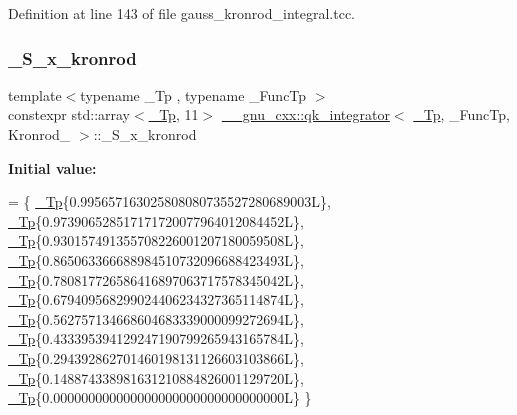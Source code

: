 Definition at line 143 of file gauss\+\_\+kronrod\+\_\+integral.\+tcc.

\mbox{\label{struct____gnu__cxx_1_1qk__integrator_3_01__Tp_00_01__FuncTp_00_01Kronrod__21_01_4_a1eb98377a298bd31aa92783c6ec6e51e}} 
\subsubsection{\texorpdfstring{\+\_\+\+S\+\_\+x\+\_\+kronrod}{\_S\_x\_kronrod}}
{\footnotesize\ttfamily template$<$typename \+\_\+\+Tp , typename \+\_\+\+Func\+Tp $>$ \\
constexpr std\+::array$<$\hyperlink{namespace____gnu__cxx_a3b19a9c800ca194374ef9172290f7d79}{\+\_\+\+Tp}, 11$>$ \hyperlink{class____gnu__cxx_1_1qk__integrator}{\+\_\+\+\_\+gnu\+\_\+cxx\+::qk\+\_\+integrator}$<$ \hyperlink{namespace____gnu__cxx_a3b19a9c800ca194374ef9172290f7d79}{\+\_\+\+Tp}, \+\_\+\+Func\+Tp, Kronrod\+\_ $>$\+::\+\_\+\+S\+\_\+x\+\_\+kronrod\hspace{0.3cm}{\ttfamily [static]}}

{\bfseries Initial value\+:}
\begin{DoxyCode}
=
      \{
        \hyperlink{namespace____gnu__cxx_a3b19a9c800ca194374ef9172290f7d79}{\_Tp}\{0.995657163025808080735527280689003L\},
        \hyperlink{namespace____gnu__cxx_a3b19a9c800ca194374ef9172290f7d79}{\_Tp}\{0.973906528517171720077964012084452L\},
        \hyperlink{namespace____gnu__cxx_a3b19a9c800ca194374ef9172290f7d79}{\_Tp}\{0.930157491355708226001207180059508L\},
        \hyperlink{namespace____gnu__cxx_a3b19a9c800ca194374ef9172290f7d79}{\_Tp}\{0.865063366688984510732096688423493L\},
        \hyperlink{namespace____gnu__cxx_a3b19a9c800ca194374ef9172290f7d79}{\_Tp}\{0.780817726586416897063717578345042L\},
        \hyperlink{namespace____gnu__cxx_a3b19a9c800ca194374ef9172290f7d79}{\_Tp}\{0.679409568299024406234327365114874L\},
        \hyperlink{namespace____gnu__cxx_a3b19a9c800ca194374ef9172290f7d79}{\_Tp}\{0.562757134668604683339000099272694L\},
        \hyperlink{namespace____gnu__cxx_a3b19a9c800ca194374ef9172290f7d79}{\_Tp}\{0.433395394129247190799265943165784L\},
        \hyperlink{namespace____gnu__cxx_a3b19a9c800ca194374ef9172290f7d79}{\_Tp}\{0.294392862701460198131126603103866L\},
        \hyperlink{namespace____gnu__cxx_a3b19a9c800ca194374ef9172290f7d79}{\_Tp}\{0.148874338981631210884826001129720L\},
        \hyperlink{namespace____gnu__cxx_a3b19a9c800ca194374ef9172290f7d79}{\_Tp}\{0.000000000000000000000000000000000L\}
      \}
\end{DoxyCode}


